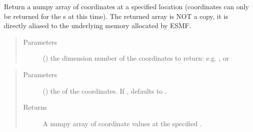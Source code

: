 \documentclass[letterpaper,10pt,english]{sphinxmanual}
\begin{document}
\begin{fulllineitems}
\begin{fulllineitems}
\end{fulllineitems}


\begin{fulllineitems}
\label{\detokenize{mesh:ESMF.api.mesh.Mesh.get_coords}}
Return a numpy array of coordinates at a specified {\hyperref[\detokenize{mesh:ESMF.api.mesh.Mesh}]{}} 
location (coordinates can only be returned for the {\hyperref[\detokenize{mesh:ESMF.api.mesh.Mesh}]{}}
{\hyperref[\detokenize{MeshLoc:ESMF.api.constants.MeshLoc.NODE}]{}}s
at this time). The returned array is NOT a copy, it is
directly aliased to the underlying memory allocated by ESMF.

\begin{quote}\begin{description}
\item[{Parameters}] \leavevmode
{} () \textendash{} the dimension number of the coordinates to return:
e.g. , or 

\end{description}\end{quote}

\begin{quote}\begin{description}
\item[{Parameters}] \leavevmode
{} ({\hyperref[\detokenize{MeshLoc:ESMF.api.constants.MeshLoc}]{}}) \textendash{} the {\hyperref[\detokenize{MeshLoc:ESMF.api.constants.MeshLoc}]{}} of the
coordinates.  If , defaults to
{\hyperref[\detokenize{MeshLoc:ESMF.api.constants.MeshLoc.NODE}]{}}.

\item[{Returns}] \leavevmode
A numpy array of coordinate values at the specified
{\hyperref[\detokenize{MeshLoc:ESMF.api.constants.MeshLoc}]{}}.

\end{description}\end{quote}

\end{fulllineitems}


\end{fulllineitems}
\end{document}
